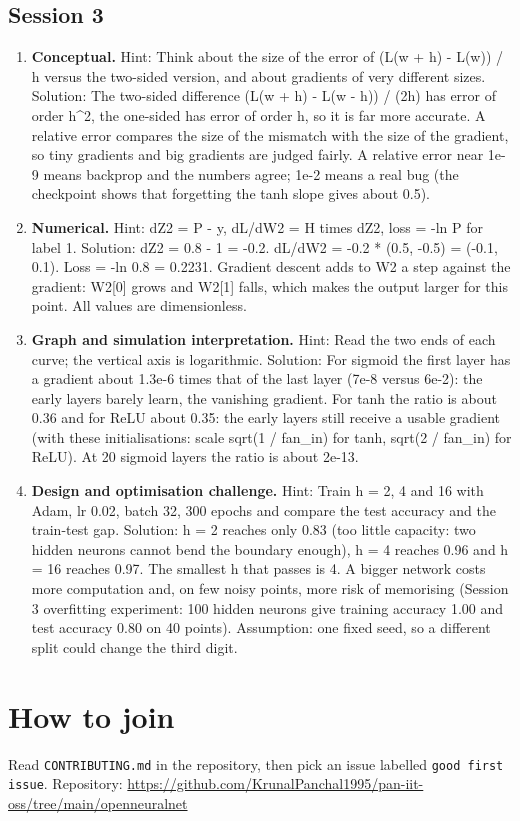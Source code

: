\documentclass[11pt,a4paper]{article}
\begin{document}
\subsection*{Session 3}
\begin{enumerate}[nosep]
\item \textbf{Conceptual.} Hint: Think about the size of the error of (L(w + h) - L(w)) / h versus the two-sided version, and about gradients of very different sizes. Solution: The two-sided difference (L(w + h) - L(w - h)) / (2h) has error of order h\textasciicircum{}2, the one-sided has error of order h, so it is far more accurate. A relative error compares the size of the mismatch with the size of the gradient, so tiny gradients and big gradients are judged fairly. A relative error near 1e-9 means backprop and the numbers agree; 1e-2 means a real bug (the checkpoint shows that forgetting the tanh slope gives about 0.5).
\item \textbf{Numerical.} Hint: dZ2 = P - y, dL/dW2 = H times dZ2, loss = -ln P for label 1. Solution: dZ2 = 0.8 - 1 = -0.2. dL/dW2 = -0.2 * (0.5, -0.5) = (-0.1, 0.1). Loss = -ln 0.8 = 0.2231. Gradient descent adds to W2 a step against the gradient: W2[0] grows and W2[1] falls, which makes the output larger for this point. All values are dimensionless.
\item \textbf{Graph and simulation interpretation.} Hint: Read the two ends of each curve; the vertical axis is logarithmic. Solution: For sigmoid the first layer has a gradient about 1.3e-6 times that of the last layer (7e-8 versus 6e-2): the early layers barely learn, the vanishing gradient. For tanh the ratio is about 0.36 and for ReLU about 0.35: the early layers still receive a usable gradient (with these initialisations: scale sqrt(1 / fan\_in) for tanh, sqrt(2 / fan\_in) for ReLU). At 20 sigmoid layers the ratio is about 2e-13.
\item \textbf{Design and optimisation challenge.} Hint: Train h = 2, 4 and 16 with Adam, lr 0.02, batch 32, 300 epochs and compare the test accuracy and the train-test gap. Solution: h = 2 reaches only 0.83 (too little capacity: two hidden neurons cannot bend the boundary enough), h = 4 reaches 0.96 and h = 16 reaches 0.97. The smallest h that passes is 4. A bigger network costs more computation and, on few noisy points, more risk of memorising (Session 3 overfitting experiment: 100 hidden neurons give training accuracy 1.00 and test accuracy 0.80 on 40 points). Assumption: one fixed seed, so a different split could change the third digit.
\end{enumerate}

\section{How to join}
Read \texttt{CONTRIBUTING.md} in the repository, then pick an issue labelled \texttt{good first issue}. Repository: \url{https://github.com/KrunalPanchal1995/pan-iit-oss/tree/main/openneuralnet}
\end{document}

